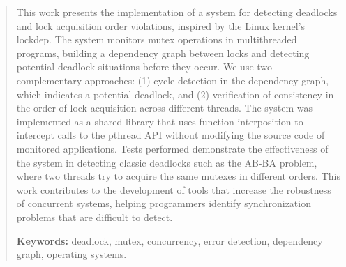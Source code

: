 \begin{abstract}
This work presents the implementation of a system for detecting deadlocks and lock acquisition order violations, inspired by the Linux kernel's lockdep. The system monitors mutex operations in multithreaded programs, building a dependency graph between locks and detecting potential deadlock situations before they occur. We use two complementary approaches: (1) cycle detection in the dependency graph, which indicates a potential deadlock, and (2) verification of consistency in the order of lock acquisition across different threads. The system was implemented as a shared library that uses function interposition to intercept calls to the pthread API without modifying the source code of monitored applications. Tests performed demonstrate the effectiveness of the system in detecting classic deadlocks such as the AB-BA problem, where two threads try to acquire the same mutexes in different orders. This work contributes to the development of tools that increase the robustness of concurrent systems, helping programmers identify synchronization problems that are difficult to detect.

\vspace{0.5cm}

\noindent\textbf{Keywords:} deadlock, mutex, concurrency, error detection, dependency graph, operating systems.
\end{abstract}
